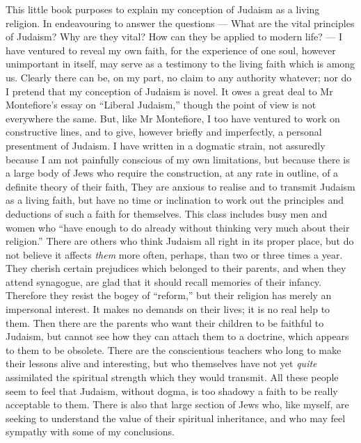 
This little book purposes to explain my
conception of Judaism as a living religion.
In endeavouring to answer the questions —
What are the vital principles of Judaism?
Why are they vital? How can they be
applied to modern life? — I have ventured to
reveal my own faith, for the experience of
one soul, however unimportant in itself, may
serve as a testimony to the living faith
which is among us. Clearly there can be,
on my part, no claim to any authority whatever;
nor do I pretend that my conception
of Judaism is novel. It owes a great deal to
Mr Montefiore’s essay on “Liberal Judaism,”
though the point of view is not everywhere
the same. But, like Mr Montefiore, I too
have ventured to work on constructive lines,
and to give, however briefly and imperfectly,
a personal presentment of Judaism. I have
written in a dogmatic strain, not assuredly
because I am not painfully conscious of my
own limitations, but because there is a large
body of Jews who require the construction,
at any rate in outline, of a definite theory of
their faith, They are anxious to realise and
to transmit Judaism as a living faith, but
have no time or inclination to work out the
principles and deductions of such a faith for
themselves. This class includes busy men
and women who “have enough to do
already without thinking very much about
their religion.” There are others who think
Judaism all right in its proper place, but do
not believe it affects \textsl{them} more often,
perhaps, than two or three times a year.
They cherish certain prejudices which
belonged to their parents, and when they
attend synagogue, are glad that it should
recall memories of their infancy. Therefore
they resist the bogey of “reform,” but their
religion has merely an impersonal interest.
It makes no demands on their lives; it is
no real help to them. Then there are the
parents who want their children to be faithful
to Judaism, but cannot see how they can
attach them to a doctrine, which appears to
them to be obsolete. There are the conscientious
teachers who long to make their
lessons alive and interesting, but who themselves
have not yet \textsl{quite} assimilated the
spiritual strength which they would transmit.
All these people seem to feel that Judaism,
without dogma, is too shadowy a faith to be
really acceptable to them. There is also
that large section of Jews who, like myself,
are seeking to understand the value
of their spiritual inheritance, and who
may feel sympathy with some of my conclusions.

